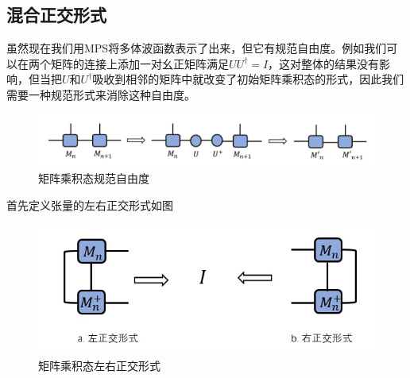 \documentclass[12pt]{article}
\begin{document}
	   \subsection{混合正交形式}
	   虽然现在我们用MPS将多体波函数表示了出来，但它有规范自由度。例如我们可以在两个矩阵的连接上添加一对幺正矩阵满足$UU^\dagger=I$，这对整体的结果没有影响，但当把$U$和$U^\dagger$吸收到相邻的矩阵中就改变了初始矩阵乘积态的形式，因此我们需要一种规范形式来消除这种自由度。\cite{schollwock2011density}
	   \begin{figure}[H]
	   	\centering
	   	\includegraphics[scale=0.7]{5.矩阵乘积态规范自由度}
	   	\caption[9pt]{ 矩阵乘积态规范自由度}
	   	\label{fig:5}
	   \end{figure}
   
       首先定义张量的左右正交形式如图
       \begin{figure}[H]
       	\centering
       	\includegraphics[scale=0.7]{6.MPS的左右正交形式}
       	\caption[9pt]{ 矩阵乘积态左右正交形式}
       	\label{fig:6}
       \end{figure}
        
\end{document}
